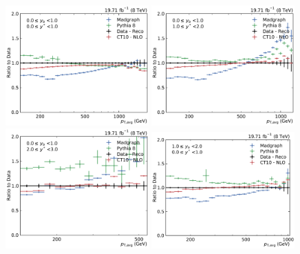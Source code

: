 \begin{figure}[htbp]
    \centering
    \includegraphics[width=0.49\textwidth]{figures/measurement/ratio_reco_to_data_yb0ys0.pdf}\hfill
    \includegraphics[width=0.49\textwidth]{figures/measurement/ratio_reco_to_data_yb0ys1.pdf}
    \includegraphics[width=0.49\textwidth]{figures/measurement/ratio_reco_to_data_yb0ys2.pdf}\hfill
    \includegraphics[width=0.49\textwidth]{figures/measurement/ratio_reco_to_data_yb1ys0.pdf}

\end{figure}
